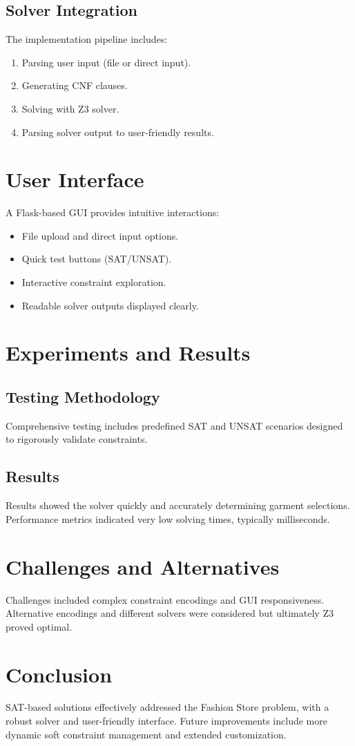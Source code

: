 \documentclass[unicode,11pt,a4paper,oneside,numbers=endperiod,openany]{scrartcl}
\begin{document}
\subsection{Solver Integration}
The implementation pipeline includes:
\begin{enumerate}
    \item Parsing user input (file or direct input).
    \item Generating CNF clauses.
    \item Solving with Z3 solver.
    \item Parsing solver output to user-friendly results.
\end{enumerate}

\section{User Interface}
A Flask-based GUI provides intuitive interactions:
\begin{itemize}
    \item File upload and direct input options.
    \item Quick test buttons (SAT/UNSAT).
    \item Interactive constraint exploration.
    \item Readable solver outputs displayed clearly.
\end{itemize}

\section{Experiments and Results}
\subsection{Testing Methodology}
Comprehensive testing includes predefined SAT and UNSAT scenarios designed to rigorously validate constraints.

\subsection{Results}
Results showed the solver quickly and accurately determining garment selections. Performance metrics indicated very low solving times, typically milliseconds.

\section{Challenges and Alternatives}
Challenges included complex constraint encodings and GUI responsiveness. Alternative encodings and different solvers were considered but ultimately Z3 proved optimal.

\section{Conclusion}
SAT-based solutions effectively addressed the Fashion Store problem, with a robust solver and user-friendly interface. Future improvements include more dynamic soft constraint management and extended customization.
\end{document}
